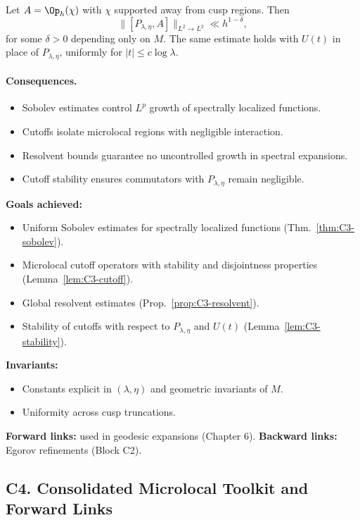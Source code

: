 \begin{lemma}\label{lem:C3-stability}
Let $A=\Op_h(\chi)$ with $\chi$ supported away from cusp regions. Then
\[
\|[P_{\lambda,\eta},A]\|_{L^2\to L^2} \ll h^{1-\delta},
\]
for some $\delta>0$ depending only on $M$. The same estimate holds with $U(t)$
in place of $P_{\lambda,\eta}$, uniformly for $|t|\le c\log \lambda$.
\end{lemma}

\paragraph{Consequences.}
\begin{itemize}
  \item Sobolev estimates control $L^p$ growth of spectrally localized functions.
  \item Cutoffs isolate microlocal regions with negligible interaction.
  \item Resolvent bounds guarantee no uncontrolled growth in spectral expansions.
  \item Cutoff stability ensures commutators with $P_{\lambda,\eta}$ remain negligible.
\end{itemize}

\begin{auditblock}[C3]
\textbf{Goals achieved:}
\begin{itemize}
  \item Uniform Sobolev estimates for spectrally localized functions (Thm.~\ref{thm:C3-sobolev}).
  \item Microlocal cutoff operators with stability and disjointness properties (Lemma~\ref{lem:C3-cutoff}).
  \item Global resolvent estimates (Prop.~\ref{prop:C3-resolvent}).
  \item Stability of cutoffs with respect to $P_{\lambda,\eta}$ and $U(t)$ (Lemma~\ref{lem:C3-stability}).
\end{itemize}
\textbf{Invariants:}
\begin{itemize}
  \item Constants explicit in $(\lambda,\eta)$ and geometric invariants of $M$.
  \item Uniformity across cusp truncations.
\end{itemize}
\textbf{Forward links:} used in geodesic expansions (Chapter 6).  
\textbf{Backward links:} Egorov refinements (Block C2).
\end{auditblock}

\subsection*{C4. Consolidated Microlocal Toolkit and Forward Links}

